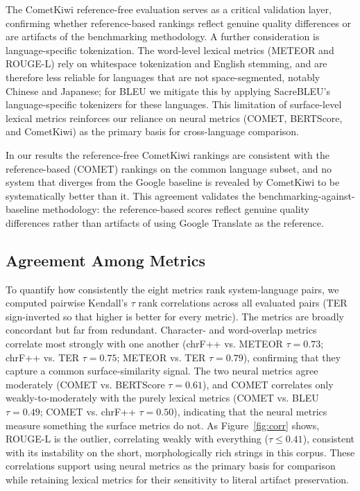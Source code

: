 \documentclass[pdflatex,sn-mathphys-num]{sn-jnl}
\begin{document}
The CometKiwi reference-free evaluation serves as a critical validation layer, confirming whether reference-based rankings reflect genuine quality differences or are artifacts of the benchmarking methodology. A further consideration is language-specific tokenization. The word-level lexical metrics (METEOR and ROUGE-L) rely on whitespace tokenization and English stemming, and are therefore less reliable for languages that are not space-segmented, notably Chinese and Japanese; for BLEU we mitigate this by applying SacreBLEU's~\cite{40} language-specific tokenizers for these languages. This limitation of surface-level lexical metrics reinforces our reliance on neural metrics (COMET, BERTScore, and CometKiwi) as the primary basis for cross-language comparison.

In our results the reference-free CometKiwi rankings are consistent with the reference-based (COMET) rankings on the common language subset, and no system that diverges from the Google baseline is revealed by CometKiwi to be systematically better than it. This agreement validates the benchmarking-against-baseline methodology: the reference-based scores reflect genuine quality differences rather than artifacts of using Google Translate as the reference.

\subsection{Agreement Among Metrics}

To quantify how consistently the eight metrics rank system-language pairs, we computed pairwise Kendall's $\tau$ rank correlations across all evaluated pairs (TER sign-inverted so that higher is better for every metric). The metrics are broadly concordant but far from redundant. Character- and word-overlap metrics correlate most strongly with one another (chrF++ vs. METEOR $\tau=0.73$; chrF++ vs. TER $\tau=0.75$; METEOR vs. TER $\tau=0.79$), confirming that they capture a common surface-similarity signal. The two neural metrics agree moderately (COMET vs. BERTScore $\tau=0.61$), and COMET correlates only weakly-to-moderately with the purely lexical metrics (COMET vs. BLEU $\tau=0.49$; COMET vs. chrF++ $\tau=0.50$), indicating that the neural metrics measure something the surface metrics do not. As Figure~\ref{fig:corr} shows, ROUGE-L is the outlier, correlating weakly with everything ($\tau \leq 0.41$), consistent with its instability on the short, morphologically rich strings in this corpus. These correlations support using neural metrics as the primary basis for comparison while retaining lexical metrics for their sensitivity to literal artifact preservation.
\end{document}
